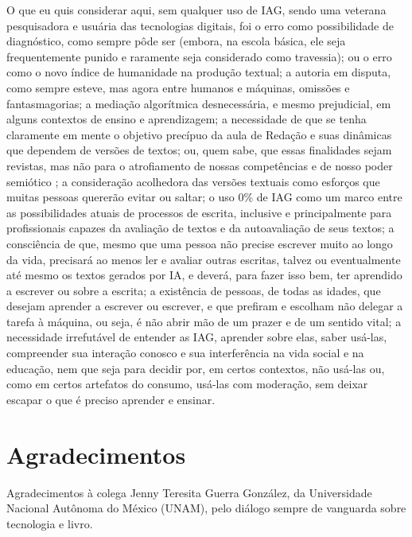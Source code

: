 \documentclass[portuguese]{textolivre}
\begin{document}
O que eu quis considerar aqui, sem qualquer uso de IAG, sendo uma veterana pesquisadora e usuária das tecnologias digitais, foi o erro como possibilidade de diagnóstico, como sempre pôde ser (embora, na escola básica, ele seja frequentemente punido e raramente seja considerado como travessia); ou o erro como o novo índice de humanidade na produção textual; a autoria em disputa, como sempre esteve, mas agora entre humanos e máquinas, omissões e fantasmagorias; a mediação algorítmica desnecessária, e mesmo prejudicial, em alguns contextos de ensino e aprendizagem; a necessidade de que se tenha claramente em mente o objetivo precípuo da aula de Redação e suas dinâmicas que dependem de versões de textos; ou, quem sabe, que essas finalidades sejam revistas, mas não para o atrofiamento de nossas competências e de nosso poder semiótico \cite{kress2003}; a consideração acolhedora das versões textuais como esforços que muitas pessoas quererão evitar ou saltar; o uso 0\% de IAG como um marco entre as possibilidades atuais de processos de escrita, inclusive e principalmente para profissionais capazes da avaliação de textos e da autoavaliação de seus textos; a consciência de que, mesmo que uma pessoa não precise escrever muito ao longo da vida, precisará ao menos ler e avaliar outras escritas, talvez ou eventualmente até mesmo os textos gerados por IA, e deverá, para fazer isso bem, ter aprendido a escrever ou sobre a escrita; a existência de pessoas, de todas as idades, que desejam aprender a escrever ou escrever, e que prefiram e escolham não delegar a tarefa à máquina, ou seja, é não abrir mão de um prazer e de um sentido vital; a necessidade irrefutável de entender as IAG, aprender sobre elas, saber usá-las, compreender sua interação conosco e sua interferência na vida social e na educação, nem que seja para decidir por, em certos contextos, não usá-las ou, como em certos artefatos do consumo, usá-las com moderação, sem deixar escapar o que é preciso aprender e ensinar.

\section*{Agradecimentos}
Agradecimentos à colega Jenny Teresita Guerra González, da Universidade Nacional Autônoma do México (UNAM), pelo diálogo sempre de vanguarda sobre tecnologia e livro.




\printbibliography\label{sec-bib}



\begin{dataavailability}
\end{dataavailability}
\end{document}
